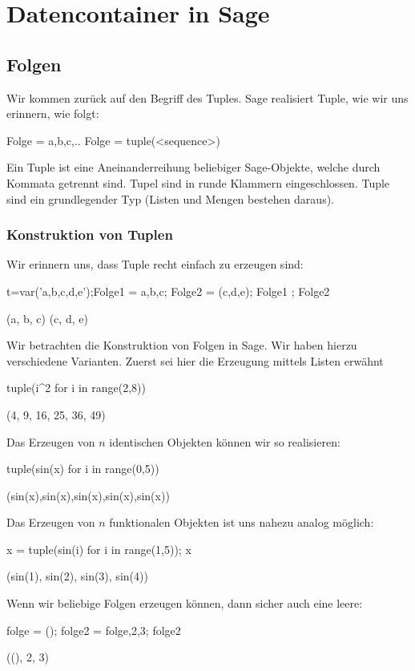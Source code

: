 \documentclass[fontsize=12pt,paper=a4,twoside,bibtotoc,idxtotoc,
liststotoc,pagesize,BCOR1.2cm,DIV15,chapterprefix,pagesize=pdftex]{scrbook}
\theoremstyle{plain}
\theoremstyle{definition}
\theoremstyle{remark}
\begin{document}
\section{Datencontainer in Sage}
\subsection{Folgen}
Wir kommen zurück auf den Begriff des Tuples. Sage realisiert Tuple, wie wir uns erinnern, wie folgt:
\begin{sagein}
 Folge = a,b,c,..
 Folge = tuple(<sequence>)
\end{sagein}
Ein Tuple ist eine Aneinanderreihung beliebiger Sage-Objekte, welche durch Kommata getrennt sind. Tupel sind in  runde Klammern eingeschlossen. Tuple sind ein 
grundlegender Typ (Listen und Mengen bestehen daraus). 
\subsubsection{Konstruktion von Tuplen}
Wir erinnern uns, dass Tuple recht einfach zu erzeugen sind:
\begin{sagein}
t=var('a,b,c,d,e');Folge1 = a,b,c; Folge2 = (c,d,e); Folge1 ; Folge2
\end{sagein}
\begin{sageout}
(a, b, c)
(c, d, e)
\end{sageout}
 Wir betrachten die Konstruktion von Folgen in Sage. Wir haben hierzu verschiedene Varianten. Zuerst sei hier die Erzeugung mittels Listen erwähnt
\begin{sagein}
tuple(i^2 for i in range(2,8))
\end{sagein}
\begin{sageout}
(4, 9, 16, 25, 36, 49)
\end{sageout}
Das Erzeugen von $n$ identischen Objekten können wir so realisieren:
\begin{sagein}
tuple(sin(x) for i in range(0,5))
\end{sagein}
\begin{sageout}
  (sin(x),sin(x),sin(x),sin(x),sin(x))
\end{sageout}
Das Erzeugen von $n$ funktionalen Objekten ist uns nahezu analog möglich:
\begin{sagein}
x = tuple(sin(i) for i in range(1,5)); x
\end{sagein}
\begin{sageout}
(sin(1), sin(2), sin(3), sin(4))
\end{sageout}  
Wenn wir beliebige Folgen erzeugen können, dann sicher auch eine leere:
\begin{sagein}
folge = (); folge2 = folge,2,3; folge2
\end{sagein}
\begin{sageout}
 ((), 2, 3)
\end{sageout}
\end{document}

